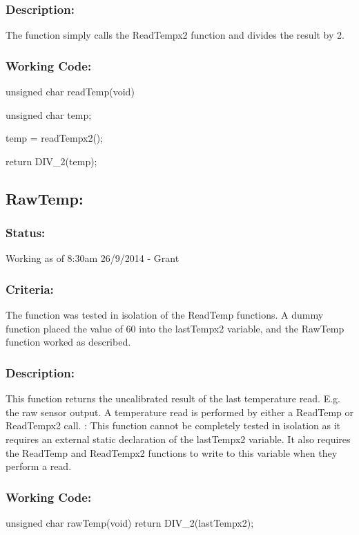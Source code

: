 \documentclass[]{article}
\begin{document}
\subsubsection{Description:}
The function simply calls the ReadTempx2 function and divides the result by 2.

\subsubsection{Working Code:}
unsigned char readTemp(void)
{
	unsigned char temp;
	
	temp = readTempx2();
	
	return DIV\_2(temp);
}

\subsection{RawTemp:}

\subsubsection{Status:}
Working as of 8:30am 26/9/2014 - Grant

\subsubsection{Criteria:}
The function was tested in isolation of the ReadTemp functions. A dummy function placed the value of 60 into the lastTempx2 variable, and the RawTemp function worked as described.

\subsubsection{Description:}
This function returns the uncalibrated result of the last temperature read. E.g. the raw sensor output. A temperature read is performed by either a ReadTemp or ReadTempx2 call. \newline:
This function cannot be completely tested in isolation as it requires an external static declaration of the lastTempx2 variable. It also requires the ReadTemp and ReadTempx2 functions to write to this variable when they perform a read.

\subsubsection{Working Code:}
unsigned char rawTemp(void)
{
	return DIV\_2(lastTempx2);
} 
\end{document}
